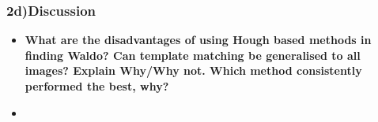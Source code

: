 \documentclass[../report.tex]{subfiles}
\begin{document}
    \begin{frame}[t]
		\frametitle{2d)Discussion}
		
		\begin{normalsize}
			\begin{itemize}
				\setlength\itemsep{1em}\fontsize{6pt}{6pt}
				
				\item[] \textbf{
					What are the disadvantages of using Hough based methods in finding Waldo? Can template matching be generalised to all images? Explain Why/Why not. Which method consistently performed the best, why?
				 }

				\item[] {\selectfont\textcolor{blue}{}}

			\end{itemize}
		\end{normalsize}
		
	\end{frame}
    
\end{document}
